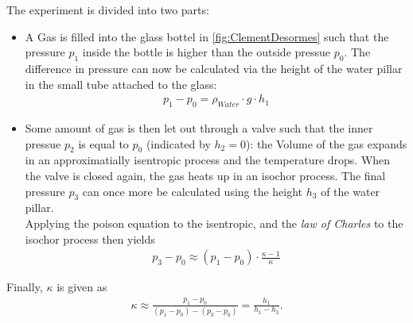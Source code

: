\documentclass{subfiles}
\begin{document}
            The experiment is divided into two parts:
            \begin{itemize}
                \item A Gas is filled into the glass bottel in \ref{fig:ClementDesormes} such that the pressure $p_1$ inside the bottle is higher than the outside pressue $p_0$. The difference in pressure can now be calculated via the height of the water pillar in the small tube attached to the glass:
                \begin{align*}
                    p_1-p_0=\rho_{Water}\cdot g\cdot h_1
                \end{align*} 
                \item Some amount of gas is then let out through a valve such that the inner pressue $p_2$ is equal to $p_0$ (indicated by $h_2=0$): the Volume of the gas expands in an approximatially isentropic process and the temperature drops. When the valve is closed again, the gas heats up in an isochor process. The final pressure $p_3$ can once more be calculated using the height $h_3$ of the water pillar.\\
                
                \noindent Applying the poison equation to the isentropic, and the \textit{law of Charles} to the isochor process then yields
                \begin{align*}
                    p_3-p_0\approx(p_1-p_0)\cdot\frac{\kappa-1}{\kappa}
                \end{align*}
            \end{itemize}
            Finally, $\kappa$ is given as 
            \begin{align*}
                \kappa\approx\frac{p_1-p_0}{(p_1-p_0)-(p_3-p_0)}=\frac{h_1}{h_1-h_3}.
            \end{align*} 


\end{document}
